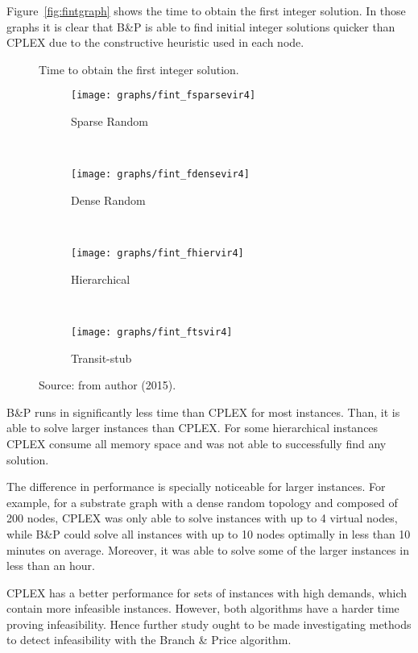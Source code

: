 Figure~\ref{fig:fintgraph} shows the time to obtain the first integer solution. In those graphs it is clear that B\&P is able to find initial integer solutions quicker than CPLEX due to the constructive heuristic used in each node.

\begin{figure*}
        \centering
        \caption{Time to obtain the first integer solution.}\label{fig:fintgraph}
        \begin{subfigure}[b]{0.480\textwidth}
                \caption{Sparse Random}
                \texttt{[image: graphs/fint\_fsparsevir4]}
                \label{fig:s22}
        \end{subfigure}
        ~
        \begin{subfigure}[b]{0.48\textwidth}
                \caption{Dense Random}
                \texttt{[image: graphs/fint\_fdensevir4]}
                \label{fig:d22}
        \end{subfigure}
        \\
        \begin{subfigure}[b]{0.48\textwidth}
                \caption{Hierarchical}
                \texttt{[image: graphs/fint\_fhiervir4]}
                \label{fig:h22}
        \end{subfigure}
        ~ 
        \begin{subfigure}[b]{0.48\textwidth}
                \caption{Transit-stub}
                \texttt{[image: graphs/fint\_ftsvir4]}
                \label{fig:t22}
        \end{subfigure}
\caption*{Source: from author (2015).}\end{figure*}

B\&P runs in significantly less time than CPLEX for most instances.%
Than, it is able to solve larger instances than CPLEX. 
For some hierarchical instances CPLEX consume all memory space and was not able to successfully find any solution.

The difference in performance is specially noticeable for larger instances. 
For example, for a substrate graph with a dense random topology and composed of 200 nodes, CPLEX was only able to solve instances with up to 4 virtual nodes, while B\&P could solve all instances with up to 10 nodes optimally in less than 10 minutes on average. 
Moreover, it was able to solve some of the larger instances in less than an hour.

CPLEX has a better performance for sets of instances with high demands, which contain more infeasible instances.
However, both algorithms have a harder time proving infeasibility.
Hence further study ought to be made investigating methods to detect infeasibility with the Branch \& Price algorithm.

